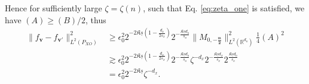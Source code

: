 \documentclass[11pt]{article}
\newcommand{\bv}{\mathbf v}
\newcommand{\0}{\mathbf{0}}
\begin{document}
\begin{appendix}
Hence for sufficiently large $\zeta = \zeta(n)$, such that Eq. \eqref{eq:zeta_one} is satisfied, we have $(A)\geq (B)/2$, thus 
\begin{align}
\label{eq:f_l2_separate}
    \|f_{\bv} - f_{\bv'}\|^2_{L^2(P_{XO})} & \geq \epsilon_0^2 2^{-2\mathfrak{K}\underline{s}\left(1 - \frac{d_x}{2s_x}\right)} 2^{-\frac{\mathfrak{K}\underline{s}d_o}{s_o}}\|M_{0,\boldsymbol{-\frac{\mathfrak{m}}{2}}}\|_{L^2(\mathbb{R}^{d_o})}^2 \frac{1}{4}(A)^2\nonumber\\
    &\gtrsim \epsilon_0^2 2^{-2\mathfrak{K}\underline{s}\left(1 - \frac{d_x}{2s_x}\right)} 2^{-\frac{\mathfrak{K}\underline{s}d_o}{s_o}}\zeta^{-d_x}2^{-\frac{\mathfrak{K}\underline{s}d_x}{s_x}}2^{\frac{\mathfrak{K}\underline{s}d_o}{s_o}}\nonumber\\
    &= \epsilon_0^2 2^{-2\mathfrak{K}\underline{s}}\zeta^{-d_x}.
\end{align}



\end{appendix}
\end{document}
